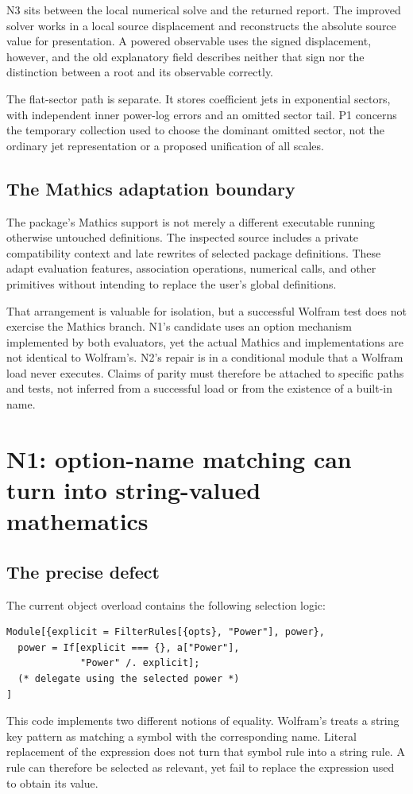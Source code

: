 \documentclass[11pt,letterpaper]{article}
\newcommand{\code}[1]{\texttt{\detokenize{#1}}}
\begin{document}
N3 sits between the local numerical solve and the returned report. The improved solver works in a local source displacement and reconstructs the absolute source value for presentation. A powered observable uses the signed displacement, however, and the old explanatory field describes neither that sign nor the distinction between a root and its observable correctly.~\cite{numchecks}

The flat-sector path is separate. It stores coefficient jets in exponential sectors, with independent inner power-log errors and an omitted sector tail. P1 concerns the temporary collection used to choose the dominant omitted sector, not the ordinary jet representation or a proposed unification of all scales.~\cite{flatops}

\subsection{The Mathics adaptation boundary}
The package's Mathics support is not merely a different executable running otherwise untouched definitions. The inspected source includes a private compatibility context and late rewrites of selected package definitions. These adapt evaluation features, association operations, numerical calls, and other primitives without intending to replace the user's global \code{System`} definitions.~\cite{mathicscompat,mathicsnum}

That arrangement is valuable for isolation, but a successful Wolfram test does not exercise the Mathics branch. N1's candidate uses an option mechanism implemented by both evaluators, yet the actual Mathics \code{OptionValue} and \code{FilterRules} implementations are not identical to Wolfram's. N2's repair is in a conditional module that a Wolfram load never executes. Claims of parity must therefore be attached to specific paths and tests, not inferred from a successful load or from the existence of a built-in name.~\cite{mathicsopt,mathicscompat}

\section{N1: option-name matching can turn into string-valued mathematics}
\label{sec:n1}

\subsection{The precise defect}
The current object overload contains the following selection logic:
\begin{lstlisting}
Module[{explicit = FilterRules[{opts}, "Power"], power},
  power = If[explicit === {}, a["Power"],
             "Power" /. explicit];
  (* delegate using the selected power *)
]
\end{lstlisting}
This code implements two different notions of equality. Wolfram's \code{FilterRules} treats a string key pattern as matching a symbol with the corresponding name. Literal replacement of the expression \code{"Power"} does not turn that symbol rule into a string rule. A rule can therefore be selected as relevant, yet fail to replace the expression used to obtain its value.~\cite{core,filterrules}
\end{document}
